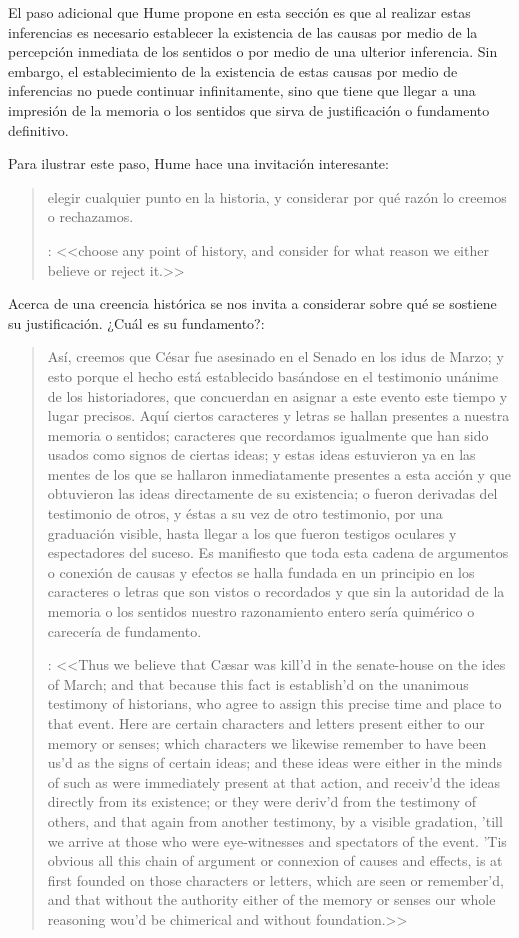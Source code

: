 El paso adicional que Hume propone en esta sección es que al realizar estas inferencias es necesario establecer la existencia de las causas por medio de la percepción inmediata de los sentidos o por medio de una ulterior inferencia. Sin embargo, el establecimiento de la existencia de estas causas por medio de inferencias no puede continuar infinitamente, sino que tiene que llegar a una impresión de la memoria o los sentidos que sirva de justificación o fundamento definitivo.

Para ilustrar este paso, Hume hace una invitación interesante: \blockquote[{\cite[58]{hume1740treatise}}: <<choose any point of history, and consider for what reason we either believe or reject it.>>]{elegir cualquier punto en la historia, y considerar por qué razón lo creemos o rechazamos.} Acerca de una creencia histórica se nos invita a considerar sobre qué se sostiene su justificación. ¿Cuál es su fundamento?: \blockquote[{\cite[58--59]{hume1740treatise}}: <<Thus we believe that Cæsar was kill’d in the senate-house on the ides of March; and that because this fact is establish’d on the unanimous testimony of historians, who agree to assign this precise time and place to that event. Here are certain characters and letters present either to our memory or senses; which characters we likewise remember to have been us’d as the signs of certain ideas; and these ideas were either in the minds of such as were immediately present at that action, and receiv’d the ideas directly from its existence; or they were deriv’d from the testimony of others, and that again from another testimony, by a visible gradation, ’till we arrive at those who were eye-witnesses and spectators of the event. ’Tis obvious all this chain of argument or connexion of causes and effects, is at first founded on those characters or letters, which are seen or remember’d, and that without the authority either of the memory or senses our whole reasoning wou’d be chimerical and without foundation.>>]{Así, creemos que César fue asesinado en el Senado en los idus de Marzo; y esto porque el hecho está establecido basándose en el testimonio unánime de los historiadores, que concuerdan en asignar a este evento este tiempo y lugar precisos. Aquí ciertos caracteres y letras se hallan presentes a nuestra memoria o sentidos; caracteres que recordamos igualmente que han sido usados como signos de ciertas ideas; y estas ideas estuvieron ya en las mentes de los que se hallaron inmediatamente presentes a esta acción y que obtuvieron las ideas directamente de su existencia; o fueron derivadas del testimonio de otros, y éstas a su vez de otro testimonio, por una graduación visible, hasta llegar a los que fueron testigos oculares y espectadores del suceso. Es manifiesto que toda esta cadena de argumentos o conexión de causas y efectos se halla fundada en un principio en los caracteres o letras que son vistos o recordados y que sin la autoridad de la memoria o los sentidos nuestro razonamiento entero sería quimérico o carecería de fundamento.}

